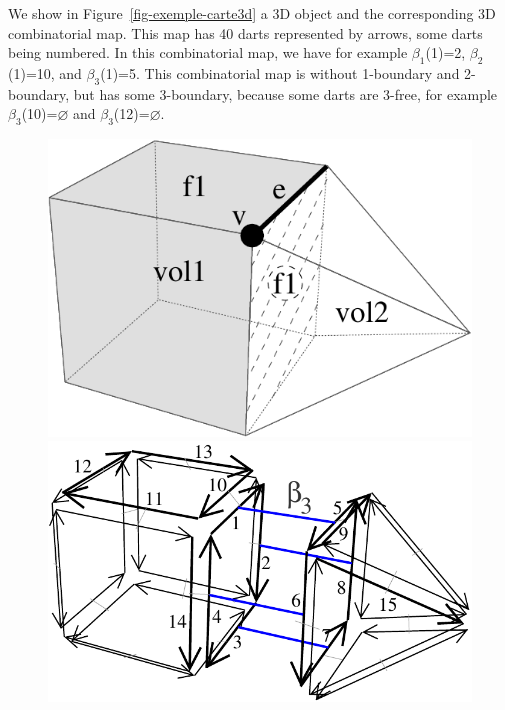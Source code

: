 We show in Figure~\ref{fig-exemple-carte3d} a 3D object and the
corresponding 3D combinatorial map.  This map has 40 darts represented
by arrows, some darts being numbered. In this combinatorial map, we
have for example $\beta_1$(1)=2, $\beta_2$(1)=10, and
$\beta_3$(1)=5. This combinatorial map is without 1-boundary and
2-boundary, but has some 3-boundary, because some darts are 3-free,
for example $\beta_3$(10)=$\varnothing$ and $\beta_3$(12)=$\varnothing$.
%
\def\LargFig{.4\textwidth}
\begin{figure}
  \begin{ccTexOnly}
    \begin{center}
      \includegraphics[width=\LargFig]{Combinatorial_map/fig/pdf/object3d}\qquad
      \includegraphics[width=\LargFig]{Combinatorial_map/fig/pdf/exemple-carte2-3d}
    \end{center}
  \end{ccTexOnly}
  \begin{ccHtmlOnly}

\end{ccHtmlOnly}
\end{figure}
